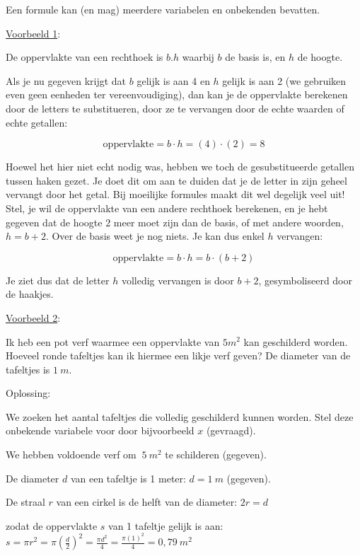 \noindent Een formule kan (en mag) meerdere variabelen en onbekenden
bevatten. \medskip{}


\uline{Voorbeeld 1}:

De oppervlakte van een rechthoek is $b.h$ waarbij $b$ de basis is,
en $h$ de hoogte.

Als je nu gegeven krijgt dat $b$ gelijk is aan 4 en $h$ gelijk is
aan 2 (we gebruiken even geen eenheden ter vereenvoudiging), dan kan
je de oppervlakte berekenen door de letters te substitueren, door
ze te vervangen door de echte waarden of echte getallen:

\begin{equation*}
\mathrm{oppervlakte}=b\cdot h=(4)\cdot(2)=8
\end{equation*}

Hoewel het hier niet echt nodig was, hebben we toch de gesubstitueerde
getallen tussen haken gezet. Je doet dit om aan te duiden dat je de
letter in zijn geheel vervangt door het getal. Bij moeilijke formules
maakt dit wel degelijk veel uit! Stel, je wil de oppervlakte van een
andere rechthoek berekenen, en je hebt gegeven dat de hoogte 2 meer
moet zijn dan de basis, of met andere woorden, $h=b+2$. Over de basis
weet je nog niets. Je kan dus enkel $h$ vervangen:

\begin{equation*}
\mathrm{oppervlakte}=b\cdot h=b\cdot(b+2)
\end{equation*}

Je ziet dus dat de letter $h$ volledig vervangen is door $b+2$,
gesymboliseerd door de haakjes.

\medskip{}


\uline{Voorbeeld 2}:

Ik heb een pot verf waarmee een oppervlakte van $5m^2$
kan geschilderd worden. Hoeveel ronde tafeltjes kan ik hiermee een
likje verf geven? De diameter van de tafeltjes is $1~m$.

Oplossing: 

We zoeken het aantal tafeltjes die volledig geschilderd kunnen worden.
Stel deze onbekende variabele voor door bijvoorbeeld $x$ (gevraagd).

We hebben voldoende verf om $~5~m^2$
te schilderen (gegeven).

De diameter $d$ van een tafeltje is 1 meter: $d=1~m$ (gegeven).

De straal $r$ van een cirkel is de helft van de diameter: $2r=d$

zodat de oppervlakte $s$ van 1 tafeltje gelijk is aan: $s=\pi r^{2}=\pi\left(\frac{d}{2}\right)^{2}=\frac{\pi d^{2}}{4}=\frac{\pi(1)^{2}}{4}=0,79~m^2$

